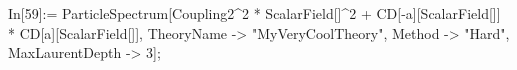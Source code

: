 In[59]:= ParticleSpectrum[Coupling2^2 * ScalarField[]^2 + CD[-a][ScalarField[]] * CD[a][ScalarField[]], TheoryName -> "MyVeryCoolTheory", Method -> "Hard", MaxLaurentDepth -> 3]; 